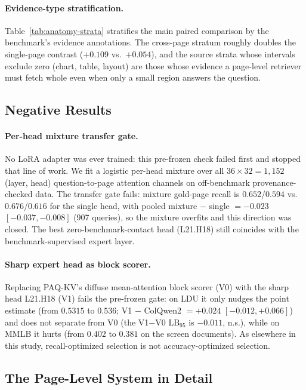 \documentclass[letterpaper]{article} %
\newcommand{\paqc}{\textsc{PAQ-KV}}
\newcommand{\lb}{\mathrm{LB}_{95}}
\begin{document}
\paragraph{Evidence-type stratification.} Table~\ref{tab:anatomy-strata} stratifies the main paired comparison by the benchmark's evidence annotations. The cross-page stratum roughly doubles the single-page contrast ($+0.109$ vs.\ $+0.054$), and the source strata whose intervals exclude zero (chart, table, layout) are those whose evidence a page-level retriever must fetch whole even when only a small region answers the question.

\subsection{Negative Results}\label{app:negatives}

\paragraph{Per-head mixture transfer gate.} No LoRA adapter was ever trained: this pre-frozen check failed first and stopped that line of work. We fit a logistic per-head mixture over all $36{\times}32=1{,}152$ (layer, head) question-to-page attention channels on off-benchmark provenance-checked data. The transfer gate fails: mixture gold-page recall is $0.652$/$0.594$ vs.\ $0.676$/$0.616$ for the single head, with pooled mixture $-$ single $=-0.023$ $[-0.037,-0.008]$ (907 queries), so the mixture overfits and this direction was closed. The best zero-benchmark-contact head (L21.H18) still coincides with the benchmark-supervised expert layer.

\paragraph{Sharp expert head as block scorer.} Replacing \paqc{}'s diffuse mean-attention block scorer (V0) with the sharp head L21.H18 (V1) fails the pre-frozen gate: on LDU it only nudges the point estimate (from $0.5315$ to $0.536$; V1 $-$ ColQwen2 $= +0.024$ $[-0.012,+0.066]$) and does not separate from V0 (the V1$-$V0 $\lb$ is $-0.011$, n.s.), while on MMLB it hurts (from $0.402$ to $0.381$ on the screen documents). As elsewhere in this study, recall-optimized selection is not accuracy-optimized selection.

\subsection{The Page-Level System in Detail}\label{app:pagelevel}
\end{document}
